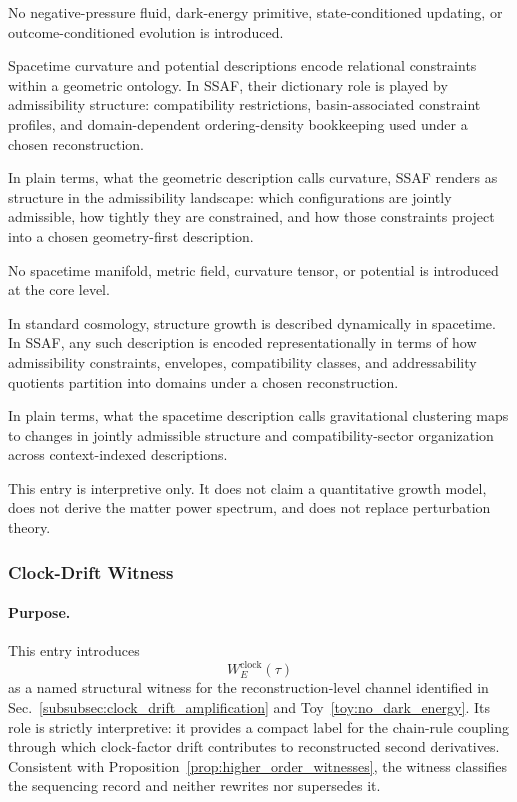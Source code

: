 \documentclass[aps,prx,onecolumn,11pt]{revtex4-2}
\theoremstyle{plain}
\theoremstyle{definition}
\theoremstyle{remark}
\begin{document}
\begin{description}
No negative-pressure fluid, dark-energy primitive, state-conditioned
updating, or outcome-conditioned evolution is introduced.

\item[\textbf{Gravitational potential and curvature language.}]
Spacetime curvature and potential descriptions encode relational
constraints within a geometric ontology. In SSAF, their dictionary role
is played by admissibility structure: compatibility restrictions,
basin-associated constraint profiles, and domain-dependent
ordering-density bookkeeping used under a chosen reconstruction.

In plain terms, what the geometric description calls curvature, SSAF
renders as structure in the admissibility landscape: which
configurations are jointly admissible, how tightly they are constrained,
and how those constraints project into a chosen geometry-first
description.

No spacetime manifold, metric field, curvature tensor, or potential is
introduced at the core level.

\item[\textbf{Growth of structure and clustering.}]
In standard cosmology, structure growth is described dynamically in
spacetime. In SSAF, any such description is encoded representationally
in terms of how admissibility constraints, envelopes, compatibility
classes, and addressability quotients partition into domains under a
chosen reconstruction.

In plain terms, what the spacetime description calls gravitational
clustering maps to changes in jointly admissible structure and
compatibility-sector organization across context-indexed descriptions.

This entry is interpretive only. It does not claim a quantitative
growth model, does not derive the matter power spectrum, and does not
replace perturbation theory.

\end{description}

\subsubsection{Clock-Drift Witness}
\label{appE:clock_drift_witness}

\paragraph{Purpose.}

This entry introduces
\[
W^{\mathrm{clock}}_E(\tau)
\]
as a named structural witness for the reconstruction-level channel
identified in Sec.~\ref{subsubsec:clock_drift_amplification} and
Toy~\ref{toy:no_dark_energy}. Its role is strictly interpretive:
it provides a compact label for the chain-rule coupling through which
clock-factor drift contributes to reconstructed second derivatives.
Consistent with Proposition~\ref{prop:higher_order_witnesses}, the
witness classifies the sequencing record and neither rewrites nor
supersedes it.
\end{document}
